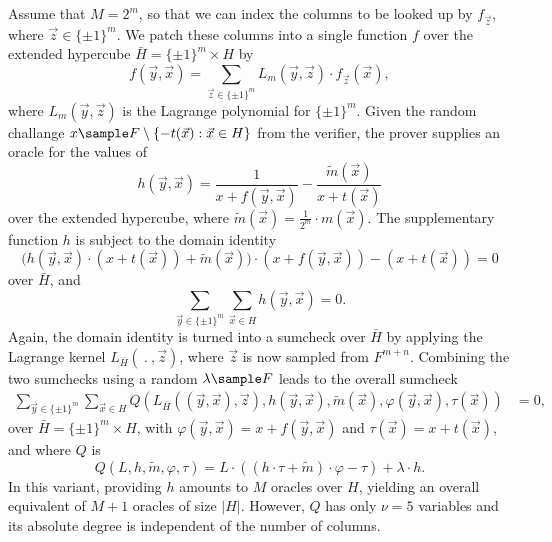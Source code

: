\documentclass[11pt]{article}
\theoremstyle{definition}
\theoremstyle{remark}
\begin{document}
Assume that $M=2^m$, so that we can index the columns to be looked up by $f_{\vec z}$, where $\vec z\in \{\pm 1\}^m$.
We patch these columns into a single function $f$ over the extended hypercube $\bar H = \{\pm 1\}^m \times H$ by
\[
f(\vec y, \vec x) = \sum_{\vec z\in \{\pm 1\}^m} L_{m}(\vec y, \vec z)\cdot f_{\vec z}(\vec x),
\]
where $L_m(\vec y, \vec z)$ is the Lagrange polynomial for $\{\pm 1\}^m$. 
Given the random challange $x\sample F\setminus \{-t(\vec x) : \vec x\in H\}$ from the verifier, the prover supplies an oracle for the values of
\begin{equation}
\label{e:lookup:large:h}
h(\vec y, \vec x) = \frac{1}{x + f(\vec y, \vec x)} - \frac{\tilde m(\vec x)}{x + t(\vec x)}
\end{equation}
over the extended hypercube, where $\tilde m(\vec x)= \frac{1}{2^m}\cdot m(\vec x)$. 
The supplementary function $h$ is subject to the domain identity
\[
\big(h(\vec y, \vec x) \cdot (x + t(\vec x)) + \tilde m(\vec x) \big) \cdot (x + f(\vec y, \vec x)) - (x + t(\vec x)) = 0
\]
over $\bar H$, and 
\[
\sum_{\vec y \in \{\pm 1\}^m}\sum_{\vec x\in H} h(\vec y, \vec x) = 0.
\]
Again, the domain identity is turned into a sumcheck over $\bar H$ by applying the Lagrange kernel $L_{\bar H}(\:.\:, \vec z)$, where $\vec z$ is now sampled from $F^{m + n}$.
Combining the two sumchecks using a random $\lambda\sample F$ leads to the overall sumcheck  
\begin{align*} 
\sum_{\vec y \in\{\pm 1\}^m}\sum_{\vec x \in H} Q(L_{\bar H}((\vec y,\vec x), \vec z),  h(\vec y, \vec x), \tilde m(\vec x),  \varphi(\vec y, \vec x), \tau(\vec x))&= 0,
\end{align*}
over $\bar H=\{\pm 1\}^m \times H$, with $\varphi(\vec y, \vec x) = x + f(\vec y, \vec x)$ and $\tau(\vec x)= x + t(\vec x)$, and where 
$Q$ is 
\begin{equation}
\label{e:lookup:Q:linear}
Q(L,h, \tilde m, \varphi, \tau) =   
L \cdot \left((h \cdot \tau +\tilde  m) \cdot \varphi - \tau \right)
+  \lambda \cdot h.
\end{equation}
In this variant, providing $h$ amounts to $M$ oracles over $H$, yielding an overall equivalent of $M+1$ oracles of size $|H|$. 
However, $Q$ has only $\nu=5$ variables and its absolute degree is  independent of the number of columns.
\end{document}
